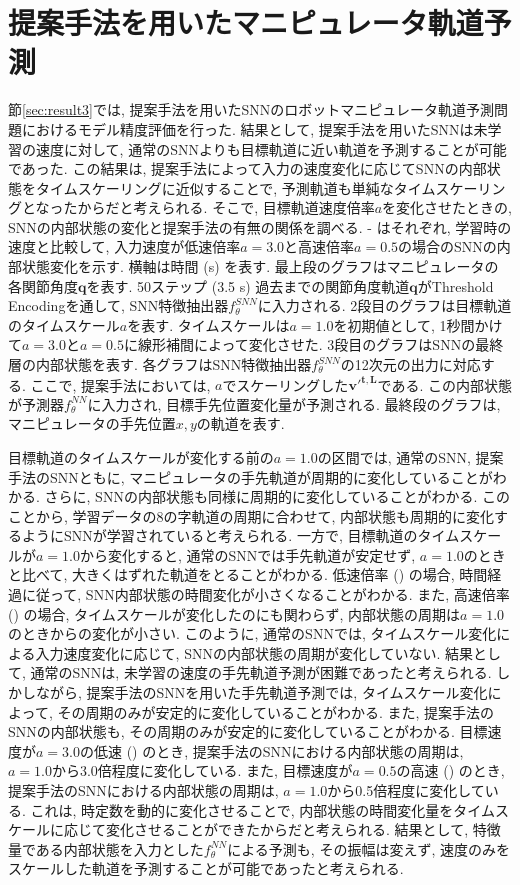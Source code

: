 \section{提案手法を用いたマニピュレータ軌道予測}

節\ref{sec:result3}では, 提案手法を用いたSNNのロボットマニピュレータ軌道予測問題におけるモデル精度評価を行った.
結果として, 提案手法を用いたSNNは未学習の速度に対して, 通常のSNNよりも目標軌道に近い軌道を予測することが可能であった.
この結果は, 提案手法によって入力の速度変化に応じてSNNの内部状態をタイムスケーリングに近似することで, 予測軌道も単純なタイムスケーリングとなったからだと考えられる.
そこで, 目標軌道速度倍率$a$を変化させたときの, SNNの内部状態の変化と提案手法の有無の関係を調べる.
 - はそれぞれ, 学習時の速度と比較して, 入力速度が低速倍率$a=3.0$と高速倍率$a=0.5$の場合のSNNの内部状態変化を示す.
横軸は時間 (s) を表す.
最上段のグラフはマニピュレータの各関節角度$\bm{q}$を表す.
50ステップ (3.5 s) 過去までの関節角度軌道$\bm{q}$がThreshold Encodingを通して, SNN特徴抽出器$f^{SNN}_\theta$に入力される.
2段目のグラフは目標軌道のタイムスケール$a$を表す.
タイムスケールは$a=1.0$を初期値として, 1秒間かけて$a=3.0$と$a=0.5$に線形補間によって変化させた.
3段目のグラフはSNNの最終層の内部状態を表す.
各グラフはSNN特徴抽出器$f^{SNN}_\theta$の12次元の出力に対応する.
ここで, 提案手法においては, $a$でスケーリングした$\bm{{v'}^{t,L}}$である.
この内部状態が予測器$f^{NN}_\theta$に入力され, 目標手先位置変化量が予測される.
最終段のグラフは, マニピュレータの手先位置$x,y$の軌道を表す.

目標軌道のタイムスケールが変化する前の$a=1.0$の区間では, 通常のSNN, 提案手法のSNNともに, マニピュレータの手先軌道が周期的に変化していることがわかる.
さらに, SNNの内部状態も同様に周期的に変化していることがわかる.
このことから, 学習データの8の字軌道の周期に合わせて, 内部状態も周期的に変化するようにSNNが学習されていると考えられる.
一方で, 目標軌道のタイムスケールが$a=1.0$から変化すると, 通常のSNNでは手先軌道が安定せず, $a=1.0$のときと比べて, 大きくはずれた軌道をとることがわかる.
低速倍率 () の場合, 時間経過に従って, SNN内部状態の時間変化が小さくなることがわかる.
また, 高速倍率 () の場合, タイムスケールが変化したのにも関わらず, 内部状態の周期は$a=1.0$のときからの変化が小さい.
このように, 通常のSNNでは, タイムスケール変化による入力速度変化に応じて, SNNの内部状態の周期が変化していない.
結果として, 通常のSNNは, 未学習の速度の手先軌道予測が困難であったと考えられる.
しかしながら, 提案手法のSNNを用いた手先軌道予測では, タイムスケール変化によって, その周期のみが安定的に変化していることがわかる.
また, 提案手法のSNNの内部状態も, その周期のみが安定的に変化していることがわかる.
目標速度が$a=3.0$の低速 () のとき, 提案手法のSNNにおける内部状態の周期は, $a=1.0$から3.0倍程度に変化している.
また, 目標速度が$a=0.5$の高速 () のとき, 提案手法のSNNにおける内部状態の周期は, $a=1.0$から0.5倍程度に変化している.
これは, 時定数を動的に変化させることで, 内部状態の時間変化量をタイムスケールに応じて変化させることができたからだと考えられる.
結果として, 特徴量である内部状態を入力とした$f^{NN}_\theta$による予測も, その振幅は変えず, 速度のみをスケールした軌道を予測することが可能であったと考えられる.

